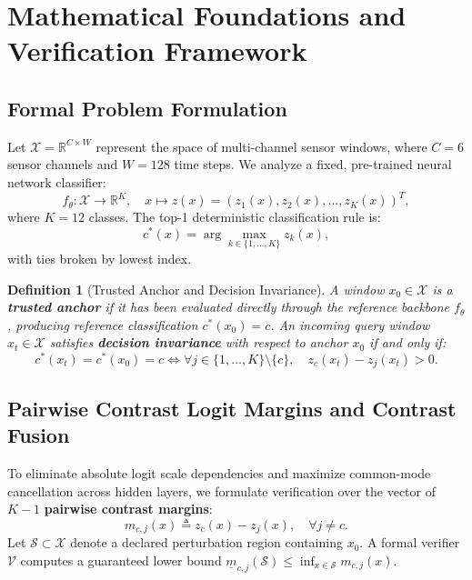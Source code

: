 \documentclass[journal,onecolumn,10pt]{IEEEtran}
\newcommand{\R}{\mathbb{R}}
\newtheorem{definition}{Definition}[section]
\theoremstyle{remark}
\begin{document}
\section{Mathematical Foundations and Verification Framework}

\subsection{Formal Problem Formulation}
Let $\mathcal{X} = \R^{C \times W}$ represent the space of multi-channel sensor windows, where $C = 6$ sensor channels and $W = 128$ time steps. We analyze a fixed, pre-trained neural network classifier:
\begin{equation}
f_\theta: \mathcal{X} \to \R^K, \quad x \mapsto z(x) = (z_1(x), z_2(x), \dots, z_K(x))^T,
\end{equation}
where $K = 12$ classes. The top-1 deterministic classification rule is:
\begin{equation}
c^*(x) = \arg\max_{k \in \{1, \dots, K\}} z_k(x),
\end{equation}
with ties broken by lowest index.

\begin{definition}[Trusted Anchor and Decision Invariance]
A window $x_0 \in \mathcal{X}$ is a \textbf{trusted anchor} if it has been evaluated directly through the reference backbone $f_\theta$, producing reference classification $c^*(x_0) = c$. An incoming query window $x_t \in \mathcal{X}$ satisfies \textbf{decision invariance} with respect to anchor $x_0$ if and only if:
\begin{equation}
c^*(x_t) = c^*(x_0) = c \iff \forall j \in \{1, \dots, K\} \setminus \{c\}, \quad z_c(x_t) - z_j(x_t) > 0.
\end{equation}
\end{definition}

\subsection{Pairwise Contrast Logit Margins and Contrast Fusion}
To eliminate absolute logit scale dependencies and maximize common-mode cancellation across hidden layers, we formulate verification over the vector of $K-1$ \textbf{pairwise contrast margins}:
\begin{equation}
m_{c,j}(x) \triangleq z_c(x) - z_j(x), \quad \forall j \neq c.
\end{equation}
Let $\mathcal{S} \subset \mathcal{X}$ denote a declared perturbation region containing $x_0$. A formal verifier $\mathcal{V}$ computes a guaranteed lower bound $\underline{m}_{c,j}(\mathcal{S}) \le \inf_{x \in \mathcal{S}} m_{c,j}(x)$.
\end{document}
